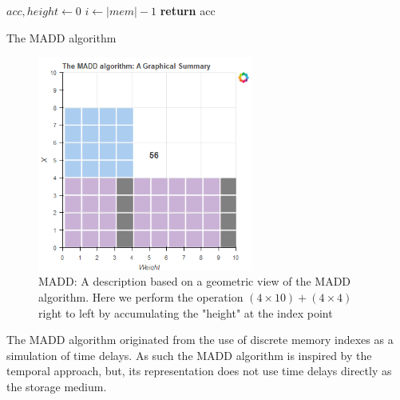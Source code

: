 \documentclass{article}
\begin{document}
\begin{algorithm}
	$acc,height \gets 0$\;
	$i \gets |mem|-1$\;
	\textbf{return} acc
	\caption{The MADD algorithm} \label{madd}
\end{algorithm}

\begin{figure}[ht]
	\centerline{\includegraphics[width=200pt]{figures/rId37.png}}
	\caption{MADD: A description based on a geometric view of the MADD algorithm. Here we perform the operation $(4 \times 10)+(4 \times 4)$ right to left by accumulating the "height" at the index point}\label{fig:madd}
\end{figure}

The MADD algorithm originated from the use of discrete memory indexes as a simulation of time delays. As such the MADD algorithm is inspired by the temporal approach, but, its representation does not use time delays directly as the storage medium.
\end{document}
